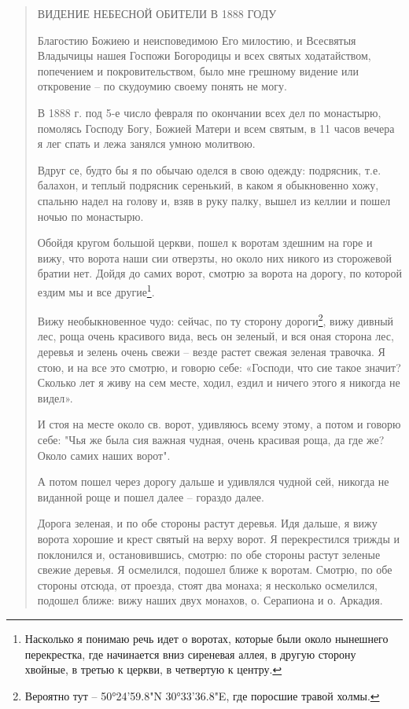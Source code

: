 \begin{quotation}
ВИДЕНИЕ НЕБЕСНОЙ ОБИТЕЛИ В 1888 ГОДУ

Благостию Божиею и неисповедимою Его милостию, и Всесвятыя Владычицы нашея Госпожи Богородицы и всех святых ходатайством, попечением и покровительством, было мне грешному видение или откровение – по скудоумию своему понять не могу.

В 1888 г. под 5-е число февраля по окончании всех дел по монастырю, помолясь Господу Богу, Божией Матери и всем святым, в 11 часов вечера я лег спать и лежа занялся умною молитвою.

Вдруг се, будто бы я по обычаю оделся в свою одежду: подрясник, т.е. балахон, и теплый подрясник серенький, в каком я обыкновенно хожу, спальню надел на голову и, взяв в руку палку, вышел из келлии и пошел ночью по монастырю.

Обойдя кругом большой церкви, пошел к воротам здешним на горе и вижу, что ворота наши сии отверзты, но около них никого из сторожевой братии нет. Дойдя до самих ворот, смотрю за ворота на дорогу, по которой ездим мы и все другие\footnote{Насколько я понимаю речь идет о воротах, которые были около нынешнего перекрестка, где начинается вниз сиреневая аллея, в другую сторону хвойные, в третью к церкви, в четвертую к центру.}. 

Вижу необыкновенное чудо: сейчас, по ту сторону дороги\footnote{Вероятно тут – 50°24'59.8"N 30°33'36.8"E, где поросшие травой холмы.}, вижу дивный лес, роща очень красивого вида, весь он зеленый, и вся оная сторона лес, деревья и зелень очень свежи – везде растет свежая зеленая травочка. Я стою, и на все это смотрю, и говорю себе: «Господи, что сие такое значит? Сколько лет я живу на сем месте, ходил,  ездил и ничего этого я никогда не видел». 

И стоя на месте около св. ворот, удивляюсь всему этому, а потом и говорю себе: "Чья же была сия важная чудная, очень красивая роща, да где же? Около самих наших ворот". 

А потом пошел через дорогу дальше и удивлялся чудной сей, никогда не виданной роще и пошел  далее – гораздо далее.

Дорога зеленая, и по обе стороны растут деревья. Идя дальше, я вижу ворота хорошие и крест святый на верху ворот. Я перекрестился трижды и поклонился и, остановившись, смотрю: по обе стороны растут зеленые свежие деревья. Я осмелился, подошел ближе к воротам. Смотрю, по обе стороны отсюда, от проезда, стоят два монаха; я несколько осмелился, подошел ближе: вижу наших двух монахов, о. Серапиона и о. Аркадия. 


\end{quotation}
